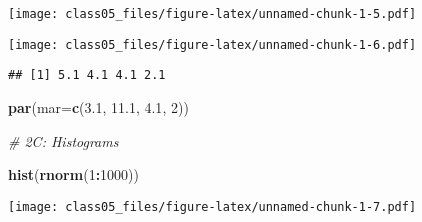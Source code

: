 \documentclass[]{article}
\newenvironment{Shaded}{\begin{snugshade}}{\end{snugshade}}
\newcommand{\KeywordTok}[1]{\textcolor[rgb]{0.13,0.29,0.53}{\textbf{#1}}}
\newcommand{\DataTypeTok}[1]{\textcolor[rgb]{0.13,0.29,0.53}{#1}}
\newcommand{\DecValTok}[1]{\textcolor[rgb]{0.00,0.00,0.81}{#1}}
\newcommand{\FloatTok}[1]{\textcolor[rgb]{0.00,0.00,0.81}{#1}}
\newcommand{\StringTok}[1]{\textcolor[rgb]{0.31,0.60,0.02}{#1}}
\newcommand{\CommentTok}[1]{\textcolor[rgb]{0.56,0.35,0.01}{\textit{#1}}}
\newcommand{\OtherTok}[1]{\textcolor[rgb]{0.56,0.35,0.01}{#1}}
\newcommand{\OperatorTok}[1]{\textcolor[rgb]{0.81,0.36,0.00}{\textbf{#1}}}
\newcommand{\NormalTok}[1]{#1}
\begin{document}
\begin{Shaded}
\end{Shaded}

\texttt{[image: class05\_files/figure-latex/unnamed-chunk-1-5.pdf]}

\begin{Shaded}
\end{Shaded}

\texttt{[image: class05\_files/figure-latex/unnamed-chunk-1-6.pdf]}

\begin{Shaded}
\end{Shaded}

\begin{verbatim}
## [1] 5.1 4.1 4.1 2.1
\end{verbatim}

\begin{Shaded}
\begin{Highlighting}[]
\KeywordTok{par}\NormalTok{(}\DataTypeTok{mar=}\KeywordTok{c}\NormalTok{(}\FloatTok{3.1}\NormalTok{, }\FloatTok{11.1}\NormalTok{, }\FloatTok{4.1}\NormalTok{, }\DecValTok{2}\NormalTok{))}

\CommentTok{# 2C: Histograms}

\KeywordTok{hist}\NormalTok{(}\KeywordTok{rnorm}\NormalTok{(}\DecValTok{1}\OperatorTok{:}\DecValTok{1000}\NormalTok{))}
\end{Highlighting}
\end{Shaded}

\texttt{[image: class05\_files/figure-latex/unnamed-chunk-1-7.pdf]}
\end{document}
